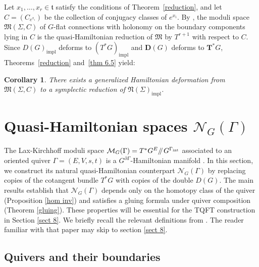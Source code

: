 \documentclass[reqno]{amsart}
\theoremstyle{plain}
\newtheorem{Cor}[Thm]{Corollary}
\theoremstyle{definition}
\newcommand{\M}{\mathcal{M}}
\newcommand{\N}{\mathcal{N}}
\newcommand{\sll}[1]{\mkern-4mu\mathbin{/\mkern-5mu/}_{\mkern-4mu{#1}}}
\begin{document}
Let $x_1, \ldots, x_r \in \mathfrak{t}$ satisfy the conditions of Theorem~\ref{reduction}, and let $C = (C_{e^{x_i}})$ be the collection of conjugacy classes of $e^{x_i}$. By \cite[Theorem~6.3]{hurtubise2006group}, the moduli space $\mathfrak{M}(\Sigma, C)$ of $G$-flat connections with holonomy on the boundary components lying in $C$ is the quasi-Hamiltonian reduction of $\mathfrak{M}$ by $T^{r+1}$ with respect to $C$. Since $D(G)_{\mathrm{impl}}$ deforms to $(T^*G)_{\mathrm{impl}}$ and $\mathbf{D}(G)$ deforms to $\mathbf{T^*}G$, Theorems~\ref{reduction} and~\ref{thm 6.5} yield:

\begin{Cor}
There exists a generalized Hamiltonian deformation from $\mathfrak{M}(\Sigma, C)$ to a symplectic reduction of $\mathfrak{N}(\Sigma)_{\mathrm{impl}}$.
\end{Cor}



\section{Quasi-Hamiltonian spaces $\N_G(\Gamma)$}\label{sect 7}

The Lax-Kirchhoff moduli space $\M_G(\Gamma) = T^*G^E\sll{} G^{\Gamma_{\text{int}}}$ associated to an oriented quiver $\Gamma = (E,V,s,t)$ is a $G^{\partial \Gamma}$-Hamiltonian manifold \cite[]{maiza2025lax}. In this section, we construct its natural quasi-Hamiltonian counterpart $\N_G(\Gamma)$ by replacing copies of the cotangent bundle $T^*G$ with copies of the double $D(G)$. The main results establish that $\N_G(\Gamma)$ depends only on the homotopy class of the quiver (Proposition \ref{hom inv}) and satisfies a gluing formula under quiver composition (Theorem \ref{gluing}). These properties will be essential for the TQFT construction in Section \ref{sect 8}. We briefly recall the relevant definitions from \cite{maiza2025lax}. The reader familiar with that paper may skip to section \ref{sect 8}.

\subsection{Quivers and their boundaries}
\end{document}
